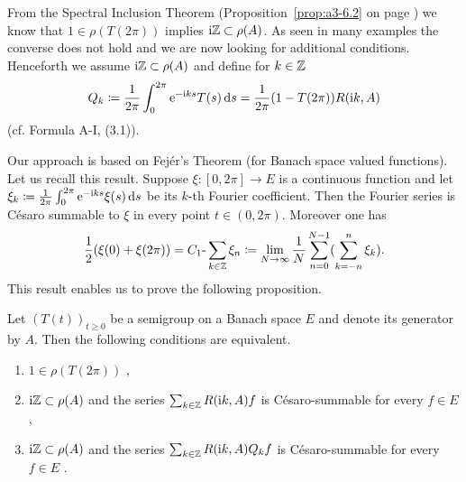 From the Spectral Inclusion Theorem (Proposition~\ref{prop:a3-6.2} on page \pageref{prop:a3-6.2}) we know that $1 \in \rho(T(2\pi))$ implies $\mathrm{i}\mathbb{Z} \subset \rho(A)$.
As seen in many examples the converse does not hold and we are now looking for additional conditions.
Henceforth we assume $\mathrm{i}\mathbb{Z} \subset \rho(A)$ and define for $k \in \mathbb{Z}$
\begin{equation}\label{eq:a3-7.7}
Q_{k}\coloneqq \frac{1}{2\pi}\int_{0}^{2\pi} \mathrm{e}^{-\mathrm{i} ks}T(s)\mathop{}\!\mathrm{d}{s} = \frac{1}{2\pi}(1 - T(2\pi))R(\mathrm{i} k,A)
\end{equation}
(cf. Formula A-I, (3.1)).

Our approach is based on Fejér's Theorem (for Banach space valued functions).
Let us recall this result.
Suppose $\xi \colon [0,2\pi] \to E$ is a continuous function and let $\xi_{k}\coloneqq \frac{1}{2\pi}\int_{0}^{2\pi} \mathrm{e}^{-\mathrm{i} ks}\xi(s)\mathop{}\!\mathrm{d}{s}$ be its $k$-th Fourier coefficient.
Then the Fourier series is Césaro summable to $\xi$ in every point $t \in (0,2\pi)$.
Moreover one has
\begin{equation}\label{eq:a3-7.8}
\frac{1}{2}(\xi(0) + \xi(2\pi)) = C_{1}\text{-}\sum_{k\in\mathbb{Z}} \xi_{n} \coloneqq \lim_{N\to\infty} \frac{1}{N}\sum_{n=0}^{N-1}(\sum_{k=-n}^{n} \xi_{k}) .
\end{equation}
This result enables us to prove the following proposition.
\begin{proposition}\label{prop:a3-7.8}
%
Let $(T(t))_{t\geq 0}$ be a semigroup on a Banach space $E$ and denote its generator by $A$.
Then the following conditions are equivalent.
\begin{enumerate}[\upshape (a)]

\item $1 \in \rho(T(2\pi))$ ,

\item 
$\mathrm{i}\mathbb{Z} \subset \rho(A)$ and the series $\sum_{k\in\mathbb{Z}} R(\mathrm{i} k,A)f$ is Césaro-summable for every $f \in E$,

\item 
$\mathrm{i}\mathbb{Z} \subset \rho(A)$ and the series $\sum_{k\in\mathbb{Z}} R(\mathrm{i} k,A)Q_{k}f$ is Césaro-summable for every $f \in E$ .

\end{enumerate}
\end{proposition}
